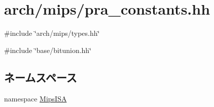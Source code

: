 \hypertarget{mips_2pra__constants_8hh}{
\section{arch/mips/pra\_\-constants.hh}
\label{mips_2pra__constants_8hh}
}
{\ttfamily \#include \char`\"{}arch/mips/types.hh\char`\"{}}\par
{\ttfamily \#include \char`\"{}base/bitunion.hh\char`\"{}}\par
\subsection*{ネームスペース}
\begin{DoxyCompactItemize}
\item 
namespace \hyperlink{namespaceMipsISA}{MipsISA}
\end{DoxyCompactItemize}
